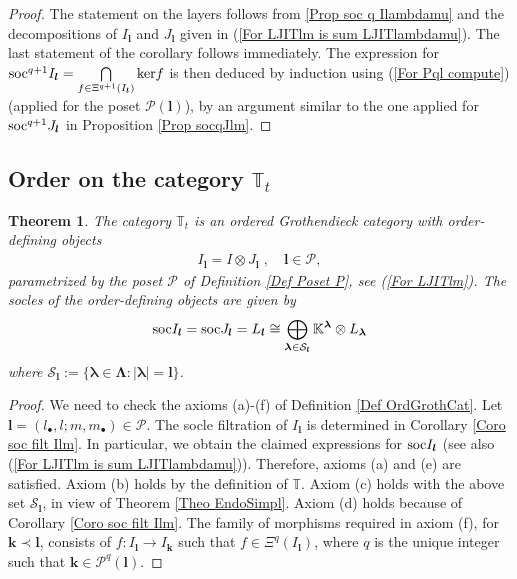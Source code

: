 \documentclass[12pt]{article}
\def\KK {{\mathbb K}}     %
\def\TT {{\mathbb T}}     %
\def\mc {\mathcal}
\newtheorem{theorem}{Theorem}[section]
\begin{document}
\begin{proof}
The statement on the layers follows from \ref{Prop soc q Ilambdamu} and the decompositions of $I_{\bm l}$ and $J_{\bm l}$ given in (\ref{For LJITlm is sum LJITlambdamu}). The last statement of the corollary follows immediately. The expression for ${\rm soc}^{q+1}I_{\bm l} =\bigcap\limits_{f\in\Xi^{q+1}(I_{\bm l})} {\rm ker}f$ is then deduced by induction using (\ref{For Pql compute}) (applied for the poset $\mc P(\bm l)$), by an argument similar to the one applied for ${\rm soc}^{q+1}J_{\bm l}$ in Proposition \ref{Prop socqJlm}.
\end{proof}


\subsection{Order on the category $\TT_t$}\label{Sect Groth order}

\begin{theorem}\label{Theo TT Grothe Order}
The category $\TT_t$ is an ordered Grothendieck category with order-defining objects
\begin{gather*}
I_{\bm l} = I \otimes J_{\bm l} \;, \quad \bm l\in\mc P ,
\end{gather*}
parametrized by the poset $\mc P$ of Definition \ref{Def Poset P}, see (\ref{For LJITlm}). The socles of the order-defining objects are given by
\begin{gather*}
{\rm soc}I_{\bm l} = {\rm soc}J_{\bm l} = L_{\bm l} \cong \bigoplus\limits_{\bm\lambda\in\mc S_{\bm l}} \KK^{\bm\lambda}\otimes L_{\bm\lambda} 
\end{gather*}
where $\mc S_{\bm l}:=\{\bm\lambda\in\bm\Lambda:|\bm\lambda|=\bm l\}$.
\end{theorem}

\begin{proof}
We need to check the axioms (a)-(f) of Definition \ref{Def OrdGrothCat}. Let $\bm l=(l_\bullet,l;m,m_\bullet)\in\mc P$. The socle filtration of $I_{\bm l}$ is determined in Corollary \ref{Coro soc filt Ilm}. In particular, we obtain the claimed expressions for ${\rm soc}I_{\bm l}$ (see also (\ref{For LJITlm is sum LJITlambdamu})). Therefore, axioms (a) and (e) are satisfied. Axiom (b) holds by the definition of $\TT$. Axiom (c) holds with the above set $\mc S_{\bm l}$, in view of Theorem \ref{Theo EndoSimpl}. Axiom (d) holds because of Corollary \ref{Coro soc filt Ilm}. The family of morphisms required in axiom (f), for $\bm k\prec\bm l$, consists of $f:I_{\bm l}\to I_{\bm k}$ such that $f\in\Xi^{q}(I_{\bm l})$, where $q$ is the unique integer such that $\bm k\in\mc P^q(\bm l)$.
\end{proof}
\end{document}

